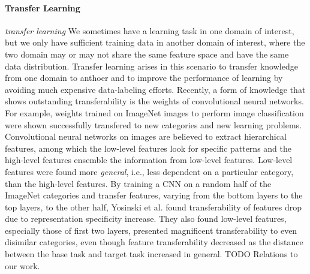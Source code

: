 \paragraph{Transfer Learning}
\textit{transfer learning}
We sometimes have a learning task in one domain of interest, but we only have sufficient training data in another domain of interest, where the two domain may or may not share the same feature space and have the same data distribution.
Transfer learning arises in this scenario to transfer knowledge from one domain to anthoer and to improve the performance of learning by avoiding much expensive data-labeling efforts.\cite{pan2010survey}
Recently, a form of knowledge that shows outstanding transferability is the weights of convolutional neural networks.
For example, weights trained on ImageNet images to perform image classification were shown successfully transfered to new categories and new learning problems\cite{girshick2014rich,long2015fully,shin2016deep}.
Convolutional neural networks on images are believed to extract hierarchical features, among which the low-level features look for specific patterns and the high-level features ensemble the information from low-level features.
Low-level features were found more \textit{general}, i.e., less dependent on a particular category, than the high-level features.\cite{yosinski2014transferable}
By training a CNN on a random half of the ImageNet categories and transfer features, varying from the bottom layers to the top layers, to the other half, Yosinski et al. found transferability of features drop due to representation specificity increase.\cite{yosinski2014transferable}
They also found low-level features, especially those of first two layers, presented magnificent transferability to even disimilar categories, even though feature transferability decreased as the distance between the base task and target task increased in general.
{TODO} Relations to our work.

